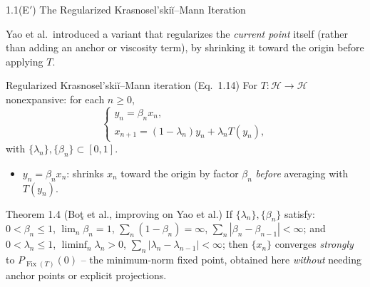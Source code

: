 \documentclass[aspectratio=169,10pt]{beamer}
\newcommand{\Hil}{\mathcal{H}}
\newcommand{\Fix}{\operatorname{Fix}}
\begin{document}
\begin{frame}{1.1(E$'$) The Regularized Krasnosel'ski\u{i}--Mann Iteration}

Yao et al.\ introduced a variant that regularizes the \emph{current point}
itself (rather than adding an anchor or viscosity term), by shrinking it
toward the origin before applying $T$.

\begin{block}{Regularized Krasnosel'ski\u{i}--Mann iteration (Eq.\ 1.14)}
For $T:\Hil\to\Hil$ nonexpansive: for each $n\ge 0$,
\[
  \begin{cases}
    y_n = \beta_n x_n,\\
    x_{n+1} = (1-\lambda_n)y_n + \lambda_n T(y_n),
  \end{cases}
\]
with $\{\lambda_n\},\{\beta_n\}\subset[0,1]$.
\begin{itemize}
  \item $y_n=\beta_n x_n$: shrinks $x_n$ toward the origin by factor
    $\beta_n$ \emph{before} averaging with $T(y_n)$.
\end{itemize}
\end{block}

\begin{block}{Theorem 1.4 (Bo\c t et al., improving on Yao et al.)}
If $\{\lambda_n\},\{\beta_n\}$ satisfy: $0<\beta_n\le1$,
$\lim_n\beta_n=1$, $\sum_n(1-\beta_n)=\infty$,
$\sum_n|\beta_n-\beta_{n-1}|<\infty$; and $0<\lambda_n\le1$,
$\liminf_n\lambda_n>0$, $\sum_n|\lambda_n-\lambda_{n-1}|<\infty$; then
$\{x_n\}$ converges \emph{strongly} to $P_{\Fix(T)}(0)$ -- the minimum-norm
fixed point, obtained here \emph{without} needing anchor points or
explicit projections.
\end{block}

\end{frame}
\end{document}

